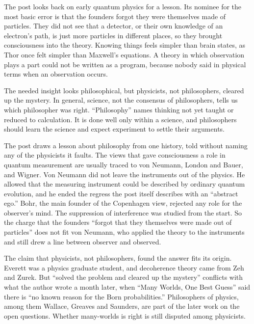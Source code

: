 \begin{afterword}
\summaryhead

The post looks back on early quantum physics for a lesson. Its nominee for the most basic error is that the founders forgot they were themselves made of particles. They did not see that a detector, or their own knowledge of an electron's path, is just more particles in different places, so they brought consciousness into the theory. Knowing things feels simpler than brain states, as Thor once felt simpler than Maxwell's equations. A theory in which observation plays a part could not be written as a program, because nobody said in physical terms when an observation occurs.

The needed insight looks philosophical, but physicists, not philosophers, cleared up the mystery. In general, science, not the consensus of philosophers, tells us which philosopher was right. ``Philosophy'' names thinking not yet taught or reduced to calculation. It is done well only within a science, and philosophers should learn the science and expect experiment to settle their arguments.

\responsehead

The post draws a lesson about philosophy from one history, told without naming any of the physicists it faults. The views that gave consciousness a role in quantum measurement are usually traced to von Neumann, London and Bauer, and Wigner. Von Neumann did not leave the instruments out of the physics. He allowed that the measuring instrument could be described by ordinary quantum evolution, and he ended the regress the post itself describes with an ``abstract ego.'' Bohr, the main founder of the Copenhagen view, rejected any role for the observer's mind. The suppression of interference was studied from the start. So the charge that the founders ``forgot that they themselves were made out of particles'' does not fit von Neumann, who applied the theory to the instruments and still drew a line between observer and observed.

The claim that physicists, not philosophers, found the answer fits its origin. Everett was a physics graduate student, and decoherence theory came from Zeh and Zurek. But ``solved the problem and cleared up the mystery'' conflicts with what the author wrote a month later, when ``Many Worlds, One Best Guess'' said there is ``no known reason for the Born probabilities.'' Philosophers of physics, among them Wallace, Greaves and Saunders, are part of the later work on the open questions. Whether many-worlds is right is still disputed among physicists.


\end{afterword}
